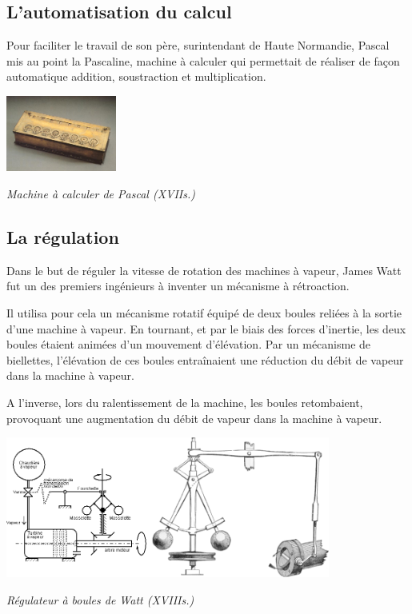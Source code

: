 \documentclass[10pt,fleqn]{article} %
\begin{document}
\subsection{L'automatisation du calcul}
\begin{minipage}[c]{0.7\textwidth}
Pour faciliter le travail de son père, surintendant de Haute Normandie, Pascal
mis au point la Pascaline, machine à calculer qui permettait de réaliser de
façon automatique addition, soustraction et multiplication.  

\end{minipage}\hfill
\begin{minipage}[c]{0.2\textwidth}
 \begin{center}
 \includegraphics[height=2.5cm]{images/pascal}

\textit{Machine à calculer de Pascal (XVII\ieme s.)}
 \end{center}
\end{minipage}

\subsection{La régulation}

Dans le but de réguler la vitesse de rotation des machines à vapeur, James Watt
fut un des premiers ingénieurs à inventer un mécanisme à rétroaction. 

Il utilisa pour cela un mécanisme rotatif équipé de deux boules reliées à la
sortie d'une machine à vapeur. En tournant, et par le biais des forces
d'inertie, les deux boules étaient animées d'un mouvement d'élévation. Par un
mécanisme de biellettes, l'élévation de ces boules entraînaient une réduction
du débit de vapeur dans la machine à vapeur. 

A l'inverse, lors du ralentissement de la machine, les boules retombaient,
provoquant une augmentation du débit de vapeur dans la machine à vapeur.

\begin{center}
 \includegraphics[width=0.8\textwidth]{images/watt}

\textit{Régulateur à boules de Watt (XVIII\ieme s.)}
 \end{center}
\end{document}
